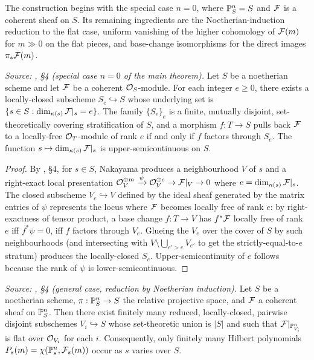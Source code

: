 The construction begins with the special case \(n = 0\), where
\(\mathbb{P}^n_S = S\) and \(\mathcal{F}\) is a coherent sheaf on \(S\).  Its remaining
ingredients are the Noetherian-induction reduction to the flat case, uniform
vanishing of the higher cohomology of \(\mathcal{F}(m)\) for \(m \gg 0\) on the flat
pieces, and base-change isomorphisms for the direct images \(\pi_*\mathcal{F}(m)\).

\begin{lemma}
  \label{mk-lem:flat_locus_open}
  \textit{Source: \cite{nitsure-hilbert-quot}, \S4 (special case \(n=0\) of the main theorem).}
  Let \(S\) be a noetherian scheme and let \(\mathcal{F}\) be a coherent \(\mathcal{O}_S\)-module.
  For each integer \(e \ge 0\), there exists a locally-closed subscheme
  \(S_e \hookrightarrow S\) whose underlying set is
  \(\{s \in S : \dim_{\kappa(s)} \mathcal{F}|_s = e\}\). The family \(\{S_e\}_e\) is a
  finite, mutually disjoint, set-theoretically covering stratification of \(S\),
  and a morphism \(f : T \to S\) pulls back \(\mathcal{F}\) to a locally-free
  \(\mathcal{O}_T\)-module of rank \(e\) if and only if \(f\) factors through \(S_e\).  The
  function \(s \mapsto \dim_{\kappa(s)} \mathcal{F}|_s\) is upper-semicontinuous on \(S\).
\end{lemma}

\begin{proof}
  By \cite{nitsure-hilbert-quot}, \S4, for \(s \in S\), Nakayama produces a
  neighbourhood \(V\) of \(s\) and a right-exact local presentation
  \(\mathcal{O}_V^{\oplus m} \xrightarrow{\psi} \mathcal{O}_V^{\oplus e} \to \mathcal{F}|_V \to 0\) where
  \(e = \dim_{\kappa(s)} \mathcal{F}|_s\).  The closed subscheme \(V_e \hookrightarrow V\)
  defined by the ideal sheaf generated by the matrix entries of \(\psi\)
  represents the locus where \(\mathcal{F}\) becomes locally free of rank \(e\): by
  right-exactness of tensor product, a base change \(f : T \to V\) has
  \(f^* \mathcal{F}\) locally free of rank \(e\) iff \(f^* \psi = 0\), iff \(f\) factors
  through \(V_e\).  Glueing the \(V_e\) over the cover of \(S\) by such
  neighbourhoods (and intersecting with \(V \setminus \bigcup_{e' > e} V_{e'}\)
  to get the strictly-equal-to-\(e\) stratum) produces the locally-closed
  \(S_e\). Upper-semicontinuity of \(e\) follows because the rank of \(\psi\) is
  lower-semicontinuous.
\end{proof}

\begin{lemma}
  \label{mk-lem:nonflat_locus_proper}
  \textit{Source: \cite{nitsure-hilbert-quot}, \S4 (general case, reduction by Noetherian induction).}
  Let \(S\) be a noetherian scheme, \(\pi : \mathbb{P}^n_S \to S\) the relative projective
  space, and \(\mathcal{F}\) a coherent sheaf on \(\mathbb{P}^n_S\).  Then there exist finitely many
  reduced, locally-closed, pairwise disjoint subschemes \(V_i \hookrightarrow S\)
  whose set-theoretic union is \(|S|\) and such that \(\mathcal{F}|_{\mathbb{P}^n_{V_i}}\) is
  flat over \(\mathcal{O}_{V_i}\) for each \(i\). Consequently, only finitely many
  Hilbert polynomials \(P_s(m) = \chi(\mathbb{P}^n_s, \mathcal{F}_s(m))\) occur as \(s\) varies
  over \(S\).
\end{lemma}

